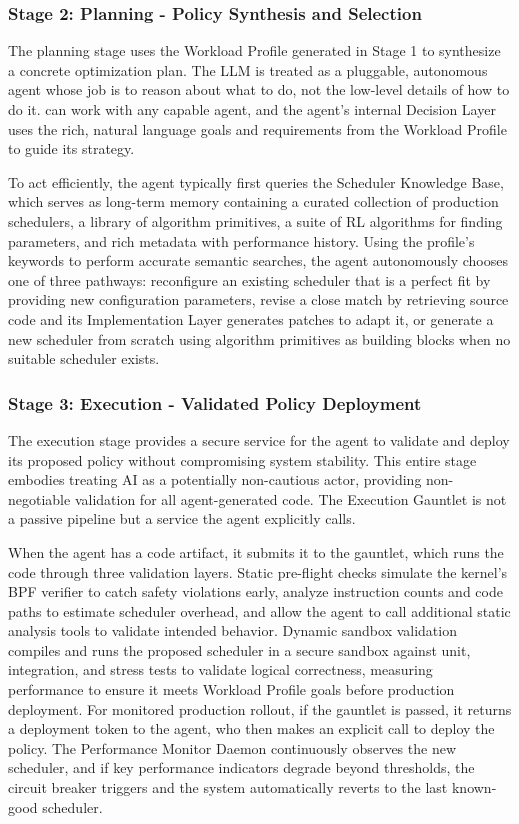 \subsubsection{Stage 2: Planning - Policy Synthesis and Selection}

The planning stage uses the Workload Profile generated in Stage 1 to synthesize a concrete optimization plan. The LLM is treated as a pluggable, autonomous agent whose job is to reason about what to do, not the low-level details of how to do it. \sys can work with any capable agent, and the agent's internal Decision Layer uses the rich, natural language goals and requirements from the Workload Profile to guide its strategy.

To act efficiently, the agent typically first queries the Scheduler Knowledge Base, which serves as long-term memory containing a curated collection of production schedulers, a library of algorithm primitives, a suite of RL algorithms for finding parameters, and rich metadata with performance history. Using the profile's keywords to perform accurate semantic searches, the agent autonomously chooses one of three pathways: reconfigure an existing scheduler that is a perfect fit by providing new configuration parameters, revise a close match by retrieving source code and its Implementation Layer generates patches to adapt it, or generate a new scheduler from scratch using algorithm primitives as building blocks when no suitable scheduler exists.

\subsubsection{Stage 3: Execution - Validated Policy Deployment}

The execution stage provides a secure service for the agent to validate and deploy its proposed policy without compromising system stability. This entire stage embodies treating AI as a potentially non-cautious actor, providing non-negotiable validation for all agent-generated code. The Execution Gauntlet is not a passive pipeline but a service the agent explicitly calls.

When the agent has a code artifact, it submits it to the gauntlet, which runs the code through three validation layers. Static pre-flight checks simulate the kernel's BPF verifier to catch safety violations early, analyze instruction counts and code paths to estimate scheduler overhead, and allow the agent to call additional static analysis tools to validate intended behavior. Dynamic sandbox validation compiles and runs the proposed scheduler in a secure sandbox against unit, integration, and stress tests to validate logical correctness, measuring performance to ensure it meets Workload Profile goals before production deployment. For monitored production rollout, if the gauntlet is passed, it returns a deployment token to the agent, who then makes an explicit call to deploy the policy. The Performance Monitor Daemon continuously observes the new scheduler, and if key performance indicators degrade beyond thresholds, the circuit breaker triggers and the system automatically reverts to the last known-good scheduler.


